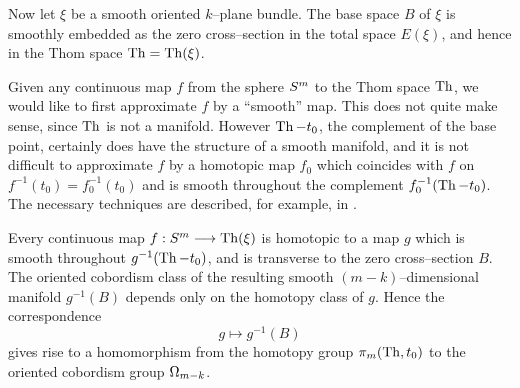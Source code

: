 \documentclass[../main]{subfiles}
\begin{document}
Now let $\xi$ be a smooth oriented $k$--plane bundle. The base space $B$ of $\xi$ is smoothly embedded as the zero cross--section in the total space $E(\xi)$, and hence in the Thom space $\operatorname{Th} = \operatorname{Th}(\xi)$. 

Given any continuous map $f$ from the sphere $S^m$ to the Thom space $\operatorname{Th}$, we would like to first approximate $f$ by a ``smooth'' map. This does not quite make sense, since $\operatorname{Th}$ is not a manifold. However $\operatorname{Th} - t_0$, the complement of the base point, certainly does have the structure of a smooth manifold, and it is not difficult to approximate $f$ by a homotopic map $f_0$ which coincides with $f$ on $f^{-1}(t_0) = f_0^{-1}(t_0)$ and is smooth throughout the complement $f_0^{-1}(\operatorname{Th} - t_0)$. The necessary techniques are described, for example, in \cite[\S6.7]{steenrod1951}. 

\begin{theorem}
\label{thm:18.6}
Every continuous map $f : S^m \longrightarrow \operatorname{Th}(\xi)$ is homotopic to a map $g$ which is smooth throughout $g^{-1}(\operatorname{Th} - t_0)$, and is transverse to the zero cross--section $B$. The oriented cobordism class of the resulting smooth $(m - k)$--dimensional manifold $g^{-1}(B)$ depends only on the homotopy class of $g$. Hence the correspondence \[g \mapsto g^{-1}(B)\] gives rise to a homomorphism from the homotopy group $\pi_m(\operatorname{Th}, t_0)$ to the oriented cobordism group $\Omega_{m - k}$. 
\end{theorem}
\end{document}
